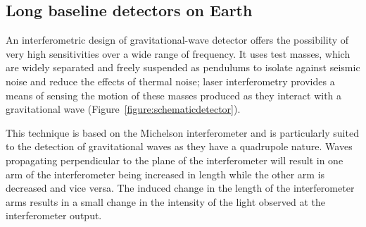\documentclass{article}
\begin{document}


\subsection{Long baseline detectors on Earth}
\label{subsection:earth}

An interferometric design of gravitational-wave detector offers the possibility
of very high sensitivities over a wide range of frequency. It uses test masses,
which are widely separated and freely suspended as pendulums to isolate against
seismic noise and reduce the effects of thermal noise; laser interferometry
provides a means of sensing the motion of these masses produced as they interact
with a gravitational wave (Figure~\ref{figure:schematicdetector}).


This technique is based on the Michelson interferometer and is particularly
suited to the detection of gravitational waves as they have a quadrupole nature.
Waves propagating perpendicular to the plane of the interferometer will result
in one arm of the interferometer being increased in length while the other arm
is decreased and vice versa. The induced change in the length of the
interferometer arms results in a small change in the intensity of the light
observed at the interferometer output.
\end{document}
